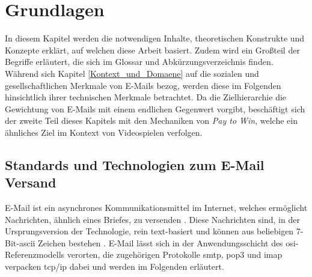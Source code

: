 
\chapter{Grundlagen}
\label{Grundlagen}

In diesem Kapitel werden die notwendigen Inhalte, theoretischen Konstrukte und Konzepte erklärt, auf welchen diese Arbeit basiert. Zudem wird ein Großteil der Begriffe erläutert, die sich im Glossar und Abkürzungsverzeichnis finden. Während sich Kapitel \ref{Kontext_und_Domaene} auf die sozialen und gesellschaftlichen Merkmale von E-Mails bezog, werden diese im Folgenden hinsichtlich ihrer technischen Merkmale betrachtet. Da die Zielhierarchie die Gewichtung von E-Mails mit einem endlichen Gegenwert vorgibt, beschäftigt sich der zweite Teil dieses Kapitels mit den Mechaniken von \emph{Pay to Win}, welche ein ähnliches Ziel im Kontext von Videospielen verfolgen.


\section{Standards und Technologien zum E-Mail Versand}

E-Mail ist ein asynchrones Kommunikationsmittel im Internet, welches ermöglicht Nachrichten, ähnlich eines Briefes, zu versenden \citep[S. 142]{Kurose2014}. Diese Nachrichten sind, in der Ursprungsversion der Technologie, rein text-basiert und können aus beliebigen 7-Bit-\acrshort{ascii} Zeichen bestehen \citep[S. 9]{RFC5322}. E-Mail lässt sich in der Anwendungsschicht des \acrshort{osi}-Referenzmodells verorten, die zugehörigen Protokolle \acrshort{smtp}, \acrshort{pop3} und \acrshort{imap} verpacken \acrshort{tcp}/\acrshort{ip} dabei und werden im Folgenden erläutert.

